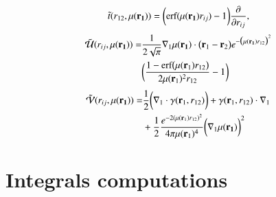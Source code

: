 \documentclass[aip,jcp,reprint,noshowkeys,superscriptaddress]{revtex4-1}
\newcommand{\deriv}[3]{\frac{\partial^{#3} #1}{\partial {#2}^{#3}}}
\newcommand{\br}[0]{{\bf {r}}}
\newcommand{\bri}[1]{{\bf r}_{#1}}
\newcommand{\mur}[1]{\mu({\bf r_{#1}})}
\begin{document}
\begin{equation}
 \begin{aligned}
 \tilde{t}(r_{12},\mur{1}) =  \bigg( \text{erf}(\mur{1} r_{ij}) - 1\bigg) \deriv{}{r_{ij}}{},
 \end{aligned}
\end{equation}
\begin{equation} 
\begin{aligned}
 \tilde{\mathcal{U}}(r_{ij},\mur{1}) = & \frac{1}{2\sqrt{\pi}}\nabla_1 \mur{1} \cdot \big(\br_1 - \br_2 \big) 
  e^{-\big( \mur{1} r_{12}\big)^2}\\ & \bigg(\frac{1 - \text{erf}\big(\mu(\bri{1}) r_{12} \big)}{2 \mu(\bri{1})^2 r_{12}} -1\bigg)
 \end{aligned}
\end{equation}
\begin{equation}
 \begin{aligned}
 \tilde{\mathcal{V}}(r_{ij},\mur{1}) = & \frac{1}{2}\bigg( \nabla_1 \cdot \gamma(\br_1, r_{12}) \bigg) + \gamma(\br_1, r_{12}) \cdot \nabla_1 
\\ 
&+ \frac{1}{2}\frac{e^{-2(\mu(\bri{1}) r_{12})^2}}{4 \pi \mu(\bri{1})^4} \bigg( \nabla_1  \mur{1}\bigg)^2
 \end{aligned}
\end{equation}

\section{Integrals computations}
\end{document}
